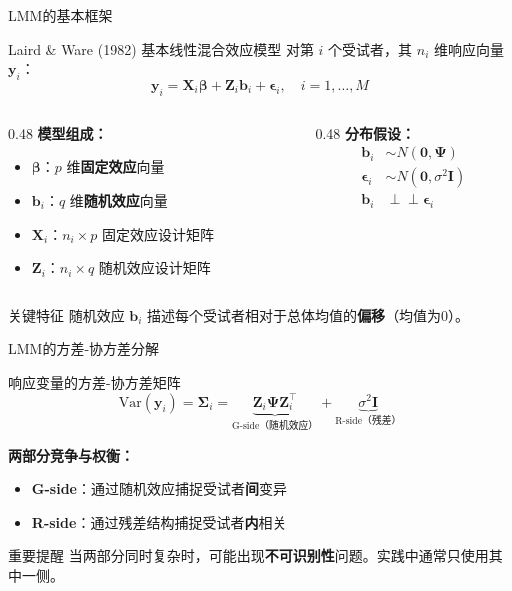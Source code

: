 \documentclass[aspectratio=169,11pt]{beamer}
\newcommand{\by}{\mathbf{y}}
\newcommand{\bX}{\mathbf{X}}
\newcommand{\bZ}{\mathbf{Z}}
\newcommand{\bbeta}{\boldsymbol{\beta}}
\newcommand{\bepsilon}{\boldsymbol{\epsilon}}
\newcommand{\bSigma}{\boldsymbol{\Sigma}}
\newcommand{\bPsi}{\boldsymbol{\Psi}}
\newcommand{\bI}{\mathbf{I}}
\newcommand{\bi}{\mathbf{b}_i}
\newcommand{\Var}{\mathrm{Var}}
\begin{document}
\begin{frame}{LMM的基本框架}
\begin{block}{Laird \& Ware (1982) 基本线性混合效应模型}
对第 $i$ 个受试者，其 $n_i$ 维响应向量 $\by_i$：
\[
\by_i = \bX_i \bbeta + \bZ_i \bi + \bepsilon_i, \quad i = 1, \dots, M
\]
\end{block}

\vspace{0.1cm}
\begin{columns}[T,totalwidth=\textwidth]
\begin{column}{0.48\textwidth}
\textbf{模型组成：}
\begin{itemize}
    \item $\bbeta$：$p$ 维\textbf{固定效应}向量
    \item $\bi$：$q$ 维\textbf{随机效应}向量
    \item $\bX_i$：$n_i \times p$ 固定效应设计矩阵
    \item $\bZ_i$：$n_i \times q$ 随机效应设计矩阵
\end{itemize}
\end{column}
\begin{column}{0.48\textwidth}
\textbf{分布假设：}
\begin{align*}
\bi &\sim N(\mathbf{0}, \bPsi) \\
\bepsilon_i &\sim N(\mathbf{0}, \sigma^2 \bI) \\
\bi &\perp\!\!\!\perp \bepsilon_i
\end{align*}
\end{column}
\end{columns}

\vspace{0.1cm}
\begin{exampleblock}{关键特征}
随机效应 $\bi$ 描述每个受试者相对于总体均值的\textbf{偏移}（均值为0）。
\end{exampleblock}
\end{frame}

\begin{frame}{LMM的方差-协方差分解}
\begin{block}{响应变量的方差-协方差矩阵}
\[
\Var(\by_i) = \bSigma_i = \underbrace{\bZ_i \bPsi \bZ_i^\top}_{\text{G-side（随机效应）}} + \underbrace{\sigma^2 \bI}_{\text{R-side（残差）}}
\]
\end{block}

\vspace{0.2cm}
\textbf{两部分竞争与权衡：}
\begin{itemize}
    \item \textbf{G-side}：通过随机效应捕捉受试者\textbf{间}变异
    \item \textbf{R-side}：通过残差结构捕捉受试者\textbf{内}相关
\end{itemize}

\vspace{0.2cm}
\begin{alertblock}{重要提醒}
当两部分同时复杂时，可能出现\textbf{不可识别性}问题。实践中通常只使用其中一侧。
\end{alertblock}
\end{frame}
\end{document}
